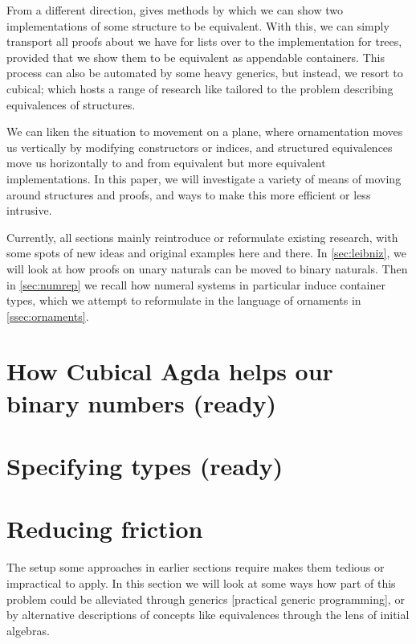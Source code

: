 \documentclass{article}
\begin{document}
From a different direction, \cite{calcdata} gives methods by which we can show two implementations of some structure to be equivalent. With this, we can simply transport all proofs about \AgdaFunction{\_++\_} we have for lists over to the implementation for trees, provided that we show them to be equivalent as appendable containers. This process can also be automated by some heavy generics, but instead, we resort to cubical; which hosts a range of research like \cite{iri} tailored to the problem describing equivalences of structures.

We can liken the situation to movement on a plane, where ornamentation moves us vertically by modifying constructors or indices, and structured equivalences move us horizontally to and from equivalent but more equivalent implementations. In this paper, we will investigate a variety of means of moving around structures and proofs, and ways to make this more efficient or less intrusive.

Currently, all sections mainly reintroduce or reformulate existing research, with some spots of new ideas and original examples here and there. In \autoref{sec:leibniz}, we will look at how proofs on unary naturals can be moved to binary naturals. Then in \autoref{sec:numrep} we recall how numeral systems in particular induce container types, which we attempt to reformulate in the language of ornaments in \autoref{ssec:ornaments}.


\section{How Cubical Agda helps our binary numbers (ready)}\label{sec:leibniz}



\section{Specifying types (ready)}\label{sec:numrep}


\section{Reducing friction}\label{sec:comfort}
The setup some approaches in earlier sections require makes them tedious or impractical to apply. In this section we will look at some ways how part of this problem could be alleviated through generics [practical generic programming], or by alternative descriptions of concepts like equivalences through the lens of initial algebras.
\end{document}
